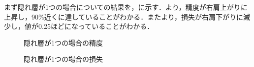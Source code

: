 \documentclass{eithesis}
\begin{document}
	まず隠れ層が1つの場合についての結果を，に示す．より，精度が右肩上がりに上昇し，90\%近くに達していることがわかる．またより，損失が右肩下がりに減少し，値が0.25ほどになっていることがわかる．
	\begin{figure}[htbp]
		\centering
		\caption{隠れ層が1つの場合の精度}
		\label{fig_hidden1_acc}
	\end{figure}
	\begin{figure}[htbp]
		\centering
		\caption{隠れ層が1つの場合の損失}
		\label{fig_hidden1_loss}
	\end{figure}
\end{document}
